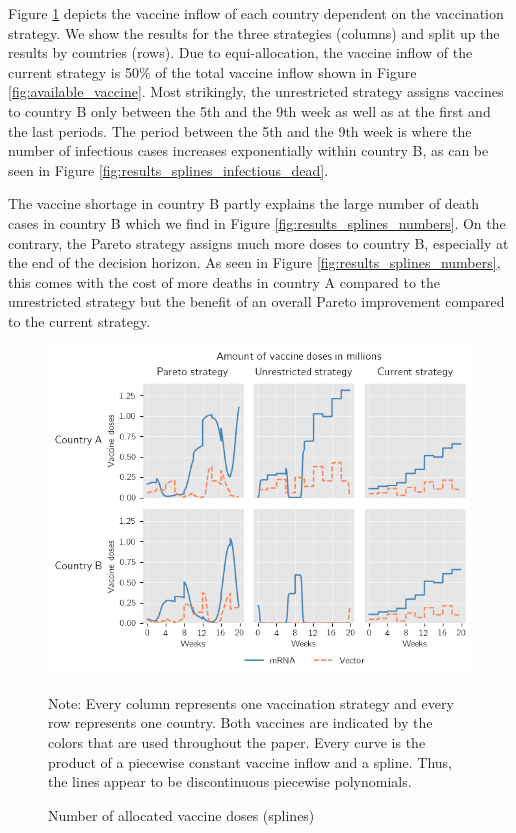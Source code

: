 Figure \ref{fig:results_splines_allocation} depicts the vaccine inflow of each country dependent on the vaccination strategy. We show the results for the three strategies (columns) and split up the results by countries (rows). Due to equi-allocation, the vaccine inflow of the current strategy is 50\% of the total vaccine inflow shown in Figure \ref{fig:available_vaccine}. Most strikingly, the unrestricted strategy assigns vaccines to country B only between the 5th and the 9th week as well as at the first and the last periods. The period between the 5th and the 9th week is where the number of infectious cases increases exponentially within country B, as can be seen in Figure \ref{fig:results_splines_infectious_dead}.

The vaccine shortage in country B partly explains the large number of death cases in country B which we find in Figure \ref{fig:results_splines_numbers}. On the contrary, the Pareto strategy assigns much more doses to country B, especially at the end of the decision horizon. As seen in Figure \ref{fig:results_splines_numbers}, this comes with the cost of more deaths in country A compared to the unrestricted strategy but the benefit of an overall Pareto improvement compared to the current strategy.
\begin{figure}[h!]
\centering
\includegraphics[scale=0.85]{images/splines_vaccine_total_quantity.png}
\begin{flushleft}
\scriptsize{Note:} Every column represents one vaccination strategy and every row represents one country. Both vaccines are indicated by the colors that are used throughout the paper. 
Every curve is the product of a piecewise constant vaccine inflow and a spline. Thus, the lines appear to be discontinuous piecewise polynomials. 
\end{flushleft}
\caption{Number of allocated vaccine doses (splines)}
\label{fig:results_splines_allocation}
\end{figure}

